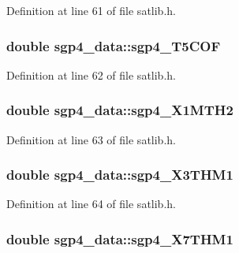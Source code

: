 Definition at line 61 of file satlib.\-h.

\hypertarget{structsgp4__data_a8139850f778b9001dc8a264e5aaa1fa0}{
\subsubsection[{sgp4\-\_\-\-T5\-C\-O\-F}]{\setlength{\rightskip}{0pt plus 5cm}double sgp4\-\_\-data\-::sgp4\-\_\-\-T5\-C\-O\-F}}\label{structsgp4__data_a8139850f778b9001dc8a264e5aaa1fa0}


Definition at line 62 of file satlib.\-h.

\hypertarget{structsgp4__data_a904322d83f088e67547a4b1a1a746860}{
\subsubsection[{sgp4\-\_\-\-X1\-M\-T\-H2}]{\setlength{\rightskip}{0pt plus 5cm}double sgp4\-\_\-data\-::sgp4\-\_\-\-X1\-M\-T\-H2}}\label{structsgp4__data_a904322d83f088e67547a4b1a1a746860}


Definition at line 63 of file satlib.\-h.

\hypertarget{structsgp4__data_aa8f9e6a5b5dc5f2f4f2dde1a7b4e308f}{
\subsubsection[{sgp4\-\_\-\-X3\-T\-H\-M1}]{\setlength{\rightskip}{0pt plus 5cm}double sgp4\-\_\-data\-::sgp4\-\_\-\-X3\-T\-H\-M1}}\label{structsgp4__data_aa8f9e6a5b5dc5f2f4f2dde1a7b4e308f}


Definition at line 64 of file satlib.\-h.

\hypertarget{structsgp4__data_af0a4991bd8b347a636712f4bc46cbebc}{
\subsubsection[{sgp4\-\_\-\-X7\-T\-H\-M1}]{\setlength{\rightskip}{0pt plus 5cm}double sgp4\-\_\-data\-::sgp4\-\_\-\-X7\-T\-H\-M1}}\label{structsgp4__data_af0a4991bd8b347a636712f4bc46cbebc}


